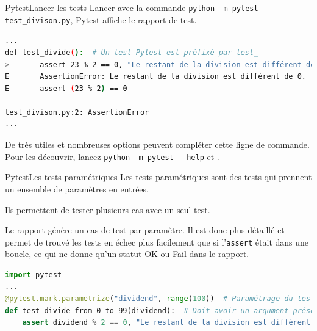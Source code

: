 \documentclass{beamer}
\begin{document}
    \begin{frame}[fragile]{Pytest}{Lancer les tests}
        \transdissolve
        Lancer avec la commande \lstinline{python -m pytest test_divison.py}, Pytest affiche le rapport de test.
        \begin{lstlisting}[language=sh]
...
def test_divide():  # Un test Pytest est préfixé par test_
>       assert 23 % 2 == 0, "Le restant de la division est différent de 0."
E       AssertionError: Le restant de la division est différent de 0.
E       assert (23 % 2) == 0

test_divison.py:2: AssertionError
...
        \end{lstlisting}

        De très utiles et nombreuses options peuvent compléter cette ligne de commande.
        Pour les découvrir, lancez \lstinline{python -m pytest --help} et .
    \end{frame}

    \begin{frame}[fragile]{Pytest}{Les tests paramétriques}
        \transdissolve
        Les tests paramétriques sont des tests qui prennent un ensemble de paramètres en entrées.

        Ils permettent de tester plusieurs cas avec un seul test.

        Le rapport génère un cas de test par paramètre.
        Il est donc plus détaillé et permet de trouvé
        les tests en échec plus facilement que si l'\lstinline {assert} était dans une boucle, ce qui ne donne qu'un statut OK ou Fail dans le rapport.
        \begin{lstlisting}[language=Python]
import pytest
...
@pytest.mark.parametrize("dividend", range(100))  # Paramétrage du test
def test_divide_from_0_to_99(dividend):  # Doit avoir un argument présent dans le paramétrage
    assert dividend % 2 == 0, "Le restant de la division est différent de 0."
        \end{lstlisting}
    \end{frame}
\end{document}
